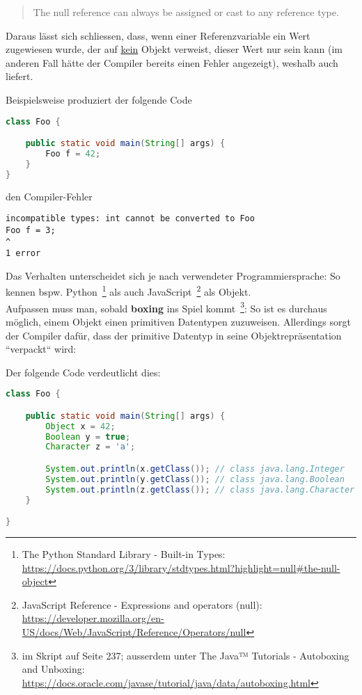 \blockquote{
    The null reference can always be assigned or cast to any reference type.
}

Daraus lässt sich schliessen, dass, wenn einer Referenzvariable ein Wert zugewiesen wurde, der auf \underline{kein} Objekt verweist,
dieser Wert nur  sein kann (im anderen Fall hätte der Compiler bereits einen Fehler angezeigt), weshalb  auch
 liefert.

Beispielsweise produziert der folgende Code
\begin{lstlisting}[language=java]
class Foo {

    public static void main(String[] args) {
        Foo f = 42;
    }
}
\end{lstlisting}

den Compiler-Fehler

\begin{lstlisting}[language=text]
incompatible types: int cannot be converted to Foo
Foo f = 3;
^
1 error
\end{lstlisting}

Das Verhalten unterscheidet sich je nach verwendeter Programmiersprache: So kennen bspw. Python~\footnote{
    The Python Standard Library - Built-in Types: \url{https://docs.python.org/3/library/stdtypes.html?highlight=null#the-null-object}
} als auch JavaScript~\footnote{JavaScript Reference - Expressions and operators (null): \url{https://developer.mozilla.org/en-US/docs/Web/JavaScript/Reference/Operators/null}
}  als Objekt.\\

Aufpassen muss man, sobald \textbf{boxing} ins Spiel kommt~\footnote{
    im Skript auf Seite 237; ausserdem unter
    The Java™ Tutorials - Autoboxing and Unboxing: \url{https://docs.oracle.com/javase/tutorial/java/data/autoboxing.html}
}: So ist es durchaus möglich,
einem Objekt einen primitiven Datentypen zuzuweisen. Allerdings sorgt der Compiler dafür, dass der primitive Datentyp
in seine Objektrepräsentation ``verpackt`` wird:

Der folgende Code verdeutlicht dies:

\begin{lstlisting}[language=java]
class Foo {

    public static void main(String[] args) {
        Object x = 42;
        Boolean y = true;
        Character z = 'a';

        System.out.println(x.getClass()); // class java.lang.Integer
        System.out.println(y.getClass()); // class java.lang.Boolean
        System.out.println(z.getClass()); // class java.lang.Character
    }

}
\end{lstlisting}

